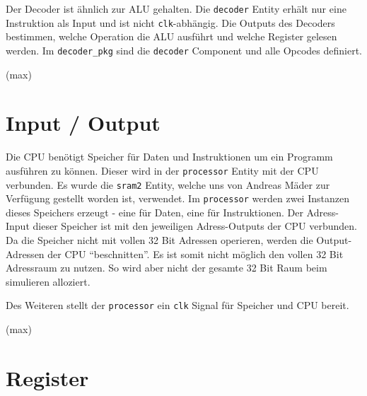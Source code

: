 \documentclass[paper=a4,fontsize=12pt,twocolumn]{scrreprt}
\begin{document}
Der Decoder ist ähnlich zur ALU gehalten.
Die \texttt{decoder} Entity erhält nur eine Instruktion als Input und ist nicht \texttt{clk}-abhängig.
Die Outputs des Decoders bestimmen, welche Operation die ALU ausführt und welche Register gelesen werden.
Im \texttt{decoder\_pkg} sind die \texttt{decoder} Component und alle Opcodes definiert.

(max)

\section{Input / Output}
\label{sec:input_output}

Die CPU benötigt Speicher für Daten und Instruktionen um ein Programm ausführen zu können.
Dieser wird in der \texttt{processor} Entity mit der CPU verbunden.
Es wurde die \texttt{sram2} Entity, welche uns von Andreas Mäder zur Verfügung gestellt worden ist, verwendet.
Im \texttt{processor} werden zwei Instanzen dieses Speichers erzeugt - eine für Daten, eine für Instruktionen.
Der Adress-Input dieser Speicher ist mit den jeweiligen Adress-Outputs der CPU verbunden.
Da die Speicher nicht mit vollen 32 Bit Adressen operieren, werden die Output-Adressen der CPU \enquote{beschnitten}.
Es ist somit nicht möglich den vollen 32 Bit Adressraum zu nutzen.
So wird aber nicht der gesamte 32 Bit Raum beim simulieren alloziert.

Des Weiteren stellt der \texttt{processor} ein \texttt{clk} Signal für Speicher und CPU bereit.

(max)

\section{Register}
\label{sec:register}
\end{document}
